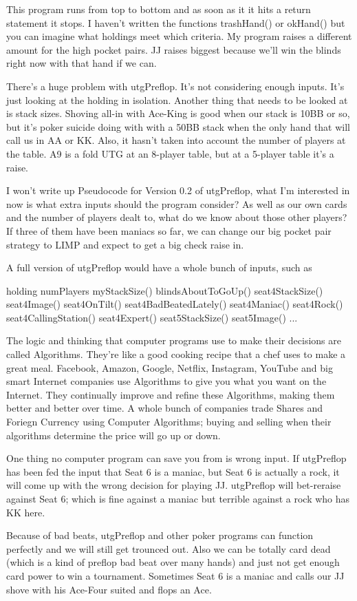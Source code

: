 This program runs from top to bottom and as soon as it it hits a
return statement it stops. I haven't written the functions
trashHand() or okHand() but you can imagine what holdings
meet which criteria. My program raises a different amount
for the high pocket pairs. JJ raises biggest because we'll win the
blinds right now with that hand if we can.

There's a huge problem with utgPreflop. It's not considering enough
inputs. It's just looking at the holding in isolation. Another thing
that needs to be looked at is stack sizes. Shoving all-in with
Ace-King is good when our stack is 10BB or so, but it's poker suicide
doing with with a 50BB stack when the only hand that will call us in
AA or KK. Also, it hasn't taken into account the number of players at
the table. A9 is a fold UTG at an 8-player table, but at a 5-player
table it's a raise.

I won't write up Pseudocode for Version 0.2 of utgPreflop, what I'm
interested in now is what extra inputs should the program consider?
As well as our own cards and the number of players dealt to, what do
we know about those other players? If three of them have been maniacs
so far, we can change our big pocket pair strategy to LIMP and expect
to get a big check raise in.

A full version of utgPreflop would have a whole bunch of inputs, such
as

holding
numPlayers
myStackSize()
blindsAboutToGoUp()
seat4StackSize()
seat4Image()
seat4OnTilt()
seat4BadBeatedLately()
seat4Maniac()
seat4Rock()
seat4CallingStation()
seat4Expert()
seat5StackSize()
seat5Image()
...

The logic and thinking that computer programs use to
make their decisions are called Algorithms. They're like a good
cooking recipe that a chef uses to make a great meal. Facebook,
Amazon, Google, Netflix, Instagram, YouTube and big smart Internet
companies use Algorithms to give you what you want on the Internet.
They continually improve and refine these Algorithms, making them
better and better over time. A whole bunch of companies trade Shares
and Foriegn Currency using Computer Algorithms; buying and selling
when their algorithms determine the price will go up or down.


One thing no computer program can save you from is wrong input.
If utgPreflop has been fed the input that Seat 6 is a maniac,
but Seat 6 is actually a rock, it will come up with the wrong decision
for playing JJ. utgPreflop will bet-reraise against Seat 6; which is
fine against a maniac but terrible against a rock who has KK here.


Because of bad beats, utgPreflop and other poker programs can function
perfectly and we will still get trounced out. Also we can be totally
card dead (which is a kind of preflop bad beat over many hands) and
just not get enough card power to win a tournament. Sometimes Seat 6
is a maniac and calls our JJ shove with his Ace-Four suited and flops
an Ace.

